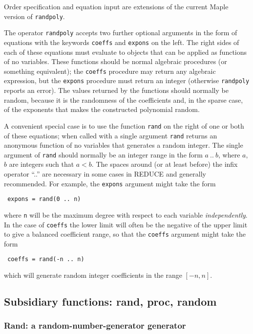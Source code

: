 Order specification and equation input are extensions of the current
Maple version of {\tt randpoly}.

The operator {\tt randpoly} accepts two further optional arguments in
the form of equations with the keywords {\tt coeffs} and {\tt expons}
on the left.  The right sides of each of these equations must evaluate
to objects that can be applied as functions of no variables.  These
functions should be normal algebraic procedures (or something
equivalent); the {\tt coeffs} procedure may return any algebraic
expression, but the {\tt expons} procedure must return an integer
(otherwise {\tt randpoly} reports an error).  The values returned by
the functions should normally be random, because it is the randomness
of the coefficients and, in the sparse case, of the exponents that
makes the constructed polynomial random.

A convenient special case is to use the function {\tt rand} on the
right of one or both of these equations; when called with a single
argument {\tt rand} returns an anonymous function of no variables that
generates a random integer.  The single argument of {\tt rand} should
normally be an integer range in the form $a~..~b$, where $a$, $b$ are
integers such that $a < b$.  The spaces around (or at least before)
the infix operator ``..'' are necessary in some cases in REDUCE and
generally recommended.  For example, the {\tt expons} argument might
take the form
\begin{center}\tt
  expons = rand(0~..~n)
\end{center}
where {\tt n} will be the maximum degree with respect to each variable
{\em independently}.  In the case of {\tt coeffs} the lower limit will
often be the negative of the upper limit to give a balanced
coefficient range, so that the {\tt coeffs} argument might take the
form
\begin{center}\tt
  coeffs = rand(-n~..~n)
\end{center}
which will generate random integer coefficients in the range $[-n,n]$.


\subsection{Subsidiary functions: rand, proc, random}
\label{randpolysec:Subsidiary}

\subsubsection{Rand: a random-number-generator generator}

